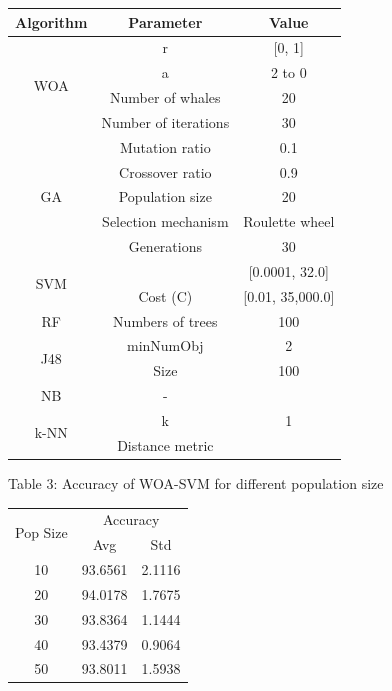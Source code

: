\begin{table}[htbp]
\centering
\begin{tabular}{|c|c|c|}\hline
Algorithm & Parameter & Value \\ \hline
\multirow{4}{*}{WOA} & r & [0, 1] \\ \cline{2-3}
  & a & 2 to 0 \\ \cline{2-3}
  & Number of whales & 20 \\ \cline{2-3}
  & Number of iterations & 30 \\ \hline
\multirow{5}{*}{GA} & Mutation ratio & 0.1 \\ \cline{2-3}
  & Crossover ratio & 0.9 \\ \cline{2-3}
  & Population size & 20 \\ \cline{2-3}
  & Selection mechanism & Roulette wheel \\ \cline{2-3}
  & Generations & 30 \\ \hline
\multirow{2}{*}{SVM} &  & [0.0001, 32.0] \\ \cline{2-3}
  & Cost (C) & [0.01, 35,000.0] \\ \hline
RF & Numbers of trees & 100 \\ \hline
\multirow{2}{*}{J48} & minNumObj & 2 \\ \cline{2-3}
  & Size & 100 \\ \hline
NB & - &  \\ \hline
\multirow{2}{*}{k-NN} & k & 1 \\ \cline{2-3}
  & Distance metric &  \\ \hline
\end{tabular}\end{table}

Table 3: Accuracy of WOA-SVM for different population size


\begin{table}[htbp]
\centering
\begin{tabular}{|c|c|c|}\hline
\multirow{2}{*}{Pop Size} & \multicolumn{2}{c|}{Accuracy} \\ \cline{2-3}
  & Avg & Std \\ \hline
10 & 93.6561 & 2.1116 \\ \hline
20 & 94.0178 & 1.7675 \\ \hline
30 & 93.8364 & 1.1444 \\ \hline
40 & 93.4379 & 0.9064 \\ \hline
50 & 93.8011 & 1.5938 \\ \hline
\end{tabular}\end{table}


